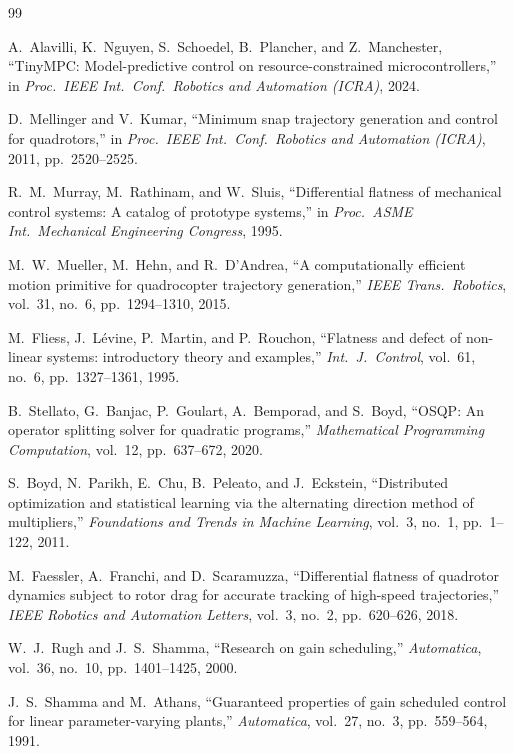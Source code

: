\begin{thebibliography}{99}

A.~Alavilli, K.~Nguyen, S.~Schoedel, B.~Plancher, and Z.~Manchester,
``TinyMPC: Model-predictive control on resource-constrained
microcontrollers,''
in \emph{Proc.\ IEEE Int.\ Conf.\ Robotics and Automation (ICRA)},
2024.

D.~Mellinger and V.~Kumar,
``Minimum snap trajectory generation and control for quadrotors,''
in \emph{Proc.\ IEEE Int.\ Conf.\ Robotics and Automation (ICRA)},
2011, pp.~2520--2525.

R.~M.~Murray, M.~Rathinam, and W.~Sluis,
``Differential flatness of mechanical control systems: A catalog of
prototype systems,''
in \emph{Proc.\ ASME Int.\ Mechanical Engineering Congress},
1995.

M.~W.~Mueller, M.~Hehn, and R.~D'Andrea,
``A computationally efficient motion primitive for quadrocopter
trajectory generation,''
\emph{IEEE Trans.\ Robotics}, vol.~31, no.~6, pp.~1294--1310, 2015.

M.~Fliess, J.~L{\'e}vine, P.~Martin, and P.~Rouchon,
``Flatness and defect of non-linear systems: introductory theory
and examples,''
\emph{Int.\ J.\ Control}, vol.~61, no.~6, pp.~1327--1361, 1995.

B.~Stellato, G.~Banjac, P.~Goulart, A.~Bemporad, and S.~Boyd,
``OSQP: An operator splitting solver for quadratic programs,''
\emph{Mathematical Programming Computation}, vol.~12, pp.~637--672,
2020.

S.~Boyd, N.~Parikh, E.~Chu, B.~Peleato, and J.~Eckstein,
``Distributed optimization and statistical learning via the alternating
direction method of multipliers,''
\emph{Foundations and Trends in Machine Learning}, vol.~3, no.~1,
pp.~1--122, 2011.

M.~Faessler, A.~Franchi, and D.~Scaramuzza,
``Differential flatness of quadrotor dynamics subject to rotor drag
for accurate tracking of high-speed trajectories,''
\emph{IEEE Robotics and Automation Letters}, vol.~3, no.~2,
pp.~620--626, 2018.

W.~J.~Rugh and J.~S.~Shamma,
``Research on gain scheduling,''
\emph{Automatica}, vol.~36, no.~10, pp.~1401--1425, 2000.

J.~S.~Shamma and M.~Athans,
``Guaranteed properties of gain scheduled control for linear
parameter-varying plants,''
\emph{Automatica}, vol.~27, no.~3, pp.~559--564, 1991.


\end{thebibliography}
